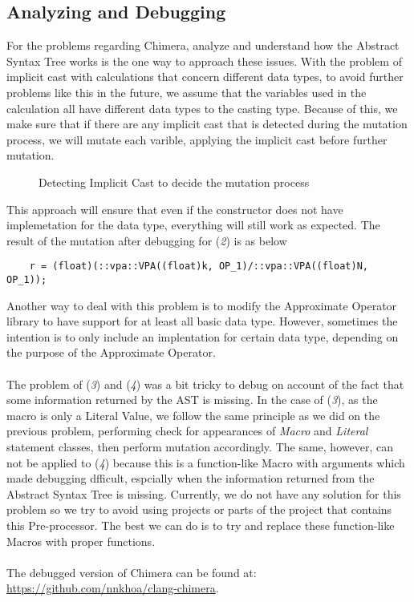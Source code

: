 \subsection{Analyzing and Debugging}

For the problems regarding Chimera, analyze and understand how the Abstract Syntax Tree works is the one way to approach these issues. With the problem of implicit cast with calculations that concern different data types, to avoid further problems like this in the future, we assume that the variables used in the calculation all have different data types to the casting type. Because of this, we make sure that if there are any implicit cast that is detected during the mutation process, we will mutate each varible, applying the implicit cast before further mutation. 
\begin{figure}[H]
\centering
\caption{Detecting Implicit Cast to decide the mutation process}
\end{figure}
This approach will ensure that even if the constructor does not have implemetation for the data type, everything will still work as expected. The result of the mutation after debugging for (\textit{2}) is as below
\begin{verbatim}
	r = (float)(::vpa::VPA((float)k, OP_1)/::vpa::VPA((float)N, OP_1));
\end{verbatim}
Another way to deal with this problem is to modify the Approximate Operator library to have support for at least all basic data type. However, sometimes the intention is to only include an implentation for certain data type, depending on the purpose of the Approximate Operator. \\
~\\
The problem of (\textit{3}) and (\textit{4}) was a bit tricky to debug on account of the fact that some information returned by the AST is missing. In the case of (\textit{3}), as the macro is only a Literal Value, we follow the same principle as we did on the previous problem, performing check for appearances of \textit{Macro} and \textit{Literal} statement classes, then perform mutation accordingly. The same, however, can not be applied to (\textit{4}) because this is a function-like Macro with arguments which made debugging dfficult, espcially when the information returned from the Abstract Syntax Tree is missing. Currently, we do not have any solution for this problem so we try to avoid using projects or parts of the project that contains this Pre-processor. The best we can do is to try and replace these function-like Macros with proper functions. \\
~\\
The debugged version of Chimera can be found at: \url{https://github.com/nnkhoa/clang-chimera}.\\

